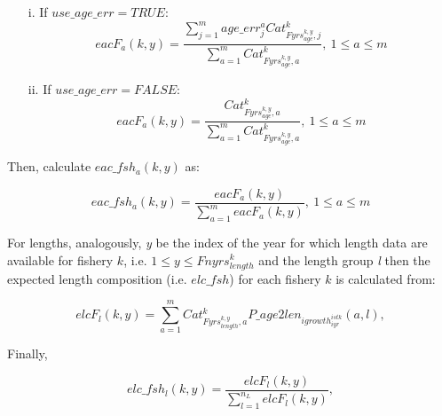 \documentclass{article}
\begin{document}
\begin{itemize}

    \item [i.] If $use\_age\_err=TRUE$:
    \begin{equation}
    {eac{F}}_a(k,y) = \dfrac{\sum_{j=1}^m age\_err^a_j  Cat_{Fyrs^{k,y}_{age},j}^k}{\displaystyle\sum_{a=1}^mCat_{Fyrs^{k,y}_{age},a}^k}, \  1\leq a \leq m
    \end{equation}
    
    \item [ii.] If $use\_age\_err=FALSE$:
    \begin{equation}
    eacF_a(k,y)=\dfrac{Cat_{Fyrs^{k,y}_{age},a}^k}{\displaystyle\sum_{a=1}^mCat_{Fyrs^{k,y}_{age},a}^k}, \  1\leq a \leq m
    \end{equation}
\end{itemize}


Then, calculate $eac\_fsh_a(k,y)$ as:

\begin{equation}
    eac\_fsh_a(k,y) = \dfrac{eacF_a(k,y)}{\displaystyle\sum_{a=1}^m eacF_a(k,y)}, \ 1\leq a \leq m 
\end{equation}

For lengths, analogously, \textit{y} be the index of the year for which length data are available for fishery $k$, i.e.   $1\leq y \leq Fnyrs^k_{length}$ and the length group \textit{l} then the expected length composition (i.e. $elc\_fsh$)
for each fishery $k$ is calculated from: 

\begin{equation}
elcF_l(k,y)=\sum_{a=1}^m Cat_{Fyrs^{k,y}_{length},a}^k P\_age2len_{igrowth^{istk}_{iyr}}(a,l),
\end{equation}

Finally,

\begin{equation}
elc\_fsh_l(k,y)=\dfrac{elcF_l(k,y)}{\displaystyle\sum_{l=1}^{n_L} elcF_l(k,y)},
\end{equation}
\end{document}
